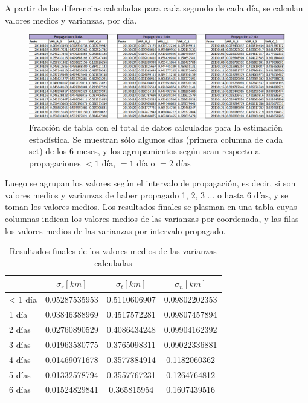 A partir de las diferencias calculadas para cada segundo de cada d\'ia, se calculan valores medios y varianzas, por d\'ia.\\


\begin{figure}[!h]
\centering
\includegraphics[width=\textwidth]{imagenes/tablacompleta}
\caption{Fracci\'on de tabla con el total de datos calculados para la estimaci\'on estad\'istica. Se muestran s\'olo algunos d\'ias (primera columna de cada set) de los 6 meses, y los agrupamientos seg\'un sean respecto a propagaciones $< 1$ d\'ia, $= 1$ d\'ia o $= 2$ d\'ias}
\label{fig:tablacompleta}
\end{figure}

Luego se agrupan los valores seg\'un el intervalo de propagaci\'on, es decir, si son valores medios y varianzas de haber propagado 1, 2, 3 ... o hasta 6 d\'ias, y se toman los valores medios. Los resultados finales se plasman en una tabla cuyas columnas indican los valores medios de las varianzas por coordenada, y las filas los valores medios de las varianzas por intervalo propagado.\\

\begin{table}[!h]
\centering
\caption[Tabla con los valores medios para la propagaci\'on de errores.]{Resultados finales de los valores medios de las varianzas calculadas}
\begin{tabular}{|l|ccc|}
\hline
&$\sigma_r [km]$ &$\sigma_t [km]$ &$\sigma_n [km]$\\
\hline
< 1 d\'ia & 0.05287535953&0.5110606907&0.09802202353\\
1 d\'ia & 0.03846388969&0.4517572281&0.09807457894\\
2 d\'ias & 0.02760890529&0.4086434248&0.09904162392\\
3 d\'ias & 0.01963580775&0.3765098311&0.09022336881\\
4 d\'ias & 0.01469071678&0.3577884914&0.1182060362\\
5 d\'ias & 0.01332578794&0.3557767231&0.1264764812\\
6 d\'ias & 0.01524829841&0.365815954&0.1607439516\\
\hline
\end{tabular}
\label{tab:resultatabla}
\end{table}

